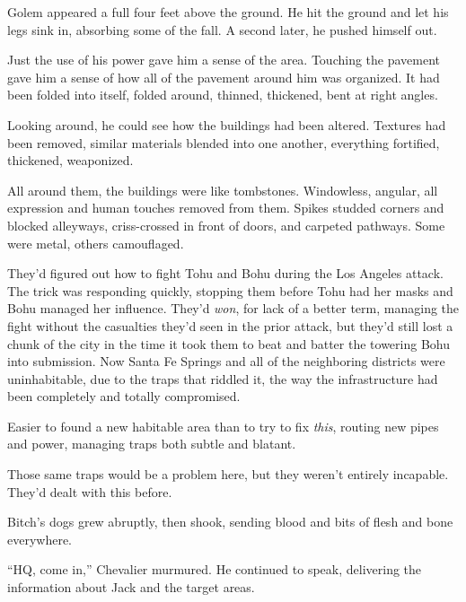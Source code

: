 \sectionbreak



Golem appeared a full four feet above the ground.  He hit the ground and let his legs sink in, absorbing some of the fall.  A second later, he pushed himself out.



Just the use of his power gave him a sense of the area.  Touching the pavement gave him a sense of how all of the pavement around him was organized.  It had been folded into itself, folded around, thinned, thickened, bent at right angles.



Looking around, he could see how the buildings had been altered.  Textures had been removed, similar materials blended into one another, everything fortified, thickened, weaponized.



All around them, the buildings were like tombstones.  Windowless, angular, all expression and human touches removed from them.  Spikes studded corners and blocked alleyways, criss-crossed in front of doors, and carpeted pathways.  Some were metal, others camouflaged.



They'd figured out how to fight Tohu and Bohu during the Los Angeles attack.  The trick was responding quickly, stopping them before Tohu had her masks and Bohu managed her influence.  They'd \emph{won}, for lack of a better term, managing the fight without the casualties they'd seen in the prior attack, but they'd still lost a chunk of the city in the time it took them to beat and batter the towering Bohu into submission.  Now Santa Fe Springs and all of the neighboring districts were uninhabitable, due to the traps that riddled it, the way the infrastructure had been completely and totally compromised.



Easier to found a new habitable area than to try to fix \emph{this}, routing new pipes and power, managing traps both subtle and blatant.



Those same traps would be a problem here, but they weren't entirely incapable.  They'd dealt with this before.



Bitch's dogs grew abruptly, then shook, sending blood and bits of flesh and bone everywhere.



``HQ, come in,'' Chevalier murmured.  He continued to speak, delivering the information about Jack and the target areas.



